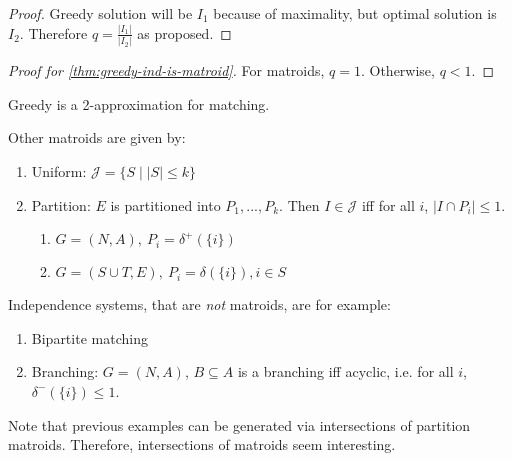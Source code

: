 \begin{proof}
    Greedy solution will be $I_1$ because of maximality, but optimal solution is $I_2$.
    Therefore $q = \frac{|I_1|}{|I_2|}$ as proposed.
\end{proof}
\begin{proof}[Proof for \autoref{thm:greedy-ind-is-matroid}]
    For matroids, $q=1$. Otherwise, $q < 1$.
\end{proof}
\begin{corollary}
    Greedy is a 2-approximation for matching.
\end{corollary}
\begin{example}
    Other matroids are given by:
    \begin{enumerate}
        \item Uniform: $\mathcal{J}=\{S \mid |S| \leq k\}$
        \item Partition: $E$ is partitioned into $P_1,...,P_k$. Then $I \in \mathcal{J}$ iff for all $i$, $|I \cap P_i| \leq 1$.
              \begin{enumerate}
                  \item  $G=(N,A),\ P_i = \delta^+(\{i\})$
                  \item  $G=(S \cup T,E),\ P_i=\delta(\{i\}), i \in S$
              \end{enumerate}
    \end{enumerate}
\end{example}
\begin{example}
    Independence systems, that are \emph{not} matroids, are for example:
    \begin{enumerate}
        \item Bipartite matching
        \item Branching: $G=(N,A)$, $B \subseteq A$ is a branching iff acyclic, i.e. for all $i$, $\delta^-(\{i\}) \leq 1$.
    \end{enumerate}
\end{example}
\begin{remark}
    Note that previous examples can be generated via intersections of partition matroids.
    Therefore, intersections of matroids seem interesting.
\end{remark}